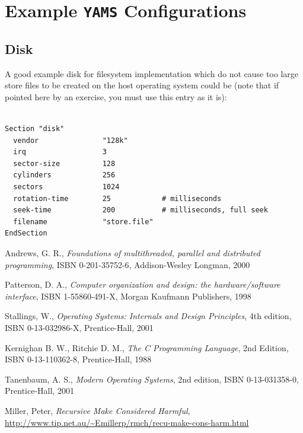 \documentclass[twoside,a4paper]{report}
\newcommand{\yams}{\texttt{\textbf{YAMS}}}
\begin{document}
\chapter{Example \yams{} Configurations}

\section{Disk}
\label{sec:exampledisk}

A good example disk for filesystem implementation which do not cause
too large store files to be created on the host operating system could
be (note that if pointed here by an exercise, you must use this entry
as it is):

\begin{verbatim}

Section "disk"
  vendor               "128k"
  irq                  3
  sector-size          128 
  cylinders            256
  sectors              1024
  rotation-time        25            # milliseconds
  seek-time            200           # milliseconds, full seek
  filename             "store.file"
EndSection

\end{verbatim}


\clearpage
{}
{}
\begin{thebibliography}{Tanenbaum}

Andrews, G. R., \emph{Foundations of multithreaded, parallel and
distributed programming}, ISBN 0-201-35752-6, Addison-Wesley Longman,
2000

Patterson, D. A., \emph{Computer organization and design: the
hardware/software interface}, ISBN 1-55860-491-X, Morgan Kaufmann
Publishers, 1998

Stallings, W., \emph{Operating Systems: Internals and Design
Principles}, 4th edition, ISBN 0-13-032986-X, Prentice-Hall, 2001

Kernighan B. W., Ritchie D. M., \emph{The C Programming Language}, 2nd
Edition, ISBN \mbox{0-13-110362-8}, Prentice-Hall, 1988

Tanenbaum, A. S., \emph{Modern Operating Systems}, 2nd edition, ISBN
\mbox{0-13-031358-0}, Prentice-Hall, 2001

Miller, Peter, \emph{Recursive Make Considered Harmful},
\url{http://www.tip.net.au/~Emillerp/rmch/recu-make-cons-harm.html}


\end{thebibliography}

\printindex
\end{document}

